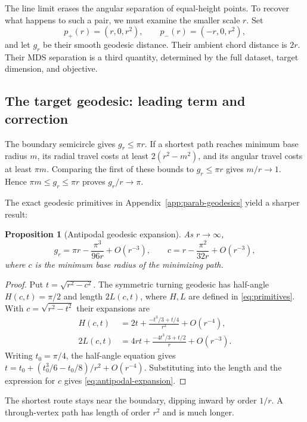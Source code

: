 \documentclass[11pt]{article}
\newtheorem{proposition}{Proposition}[section]
\theoremstyle{remark}\newtheorem{remark}[proposition]{Remark}
\begin{document}
The line limit erases the angular separation of equal-height points. To recover
what happens to such a pair, we must examine the smaller scale $r$. Set
\begin{equation}
 p_+(r)=(r,0,r^2),\qquad p_-(r)=(-r,0,r^2),
\end{equation}
and let $g_r$ be their smooth geodesic distance. Their ambient chord distance
is $2r$. Their MDS separation is a third quantity, determined by the full
dataset, target dimension, and objective.

\subsection{The target geodesic: leading term and correction}
The boundary semicircle gives $g_r\le\pi r$. If a shortest path reaches minimum
base radius $m$, its radial travel costs at least $2(r^2-m^2)$, and its angular
travel costs at least $\pi m$. Comparing the first of these bounds to
$g_r\le\pi r$ gives $m/r\to1$. Hence
$\pi m\le g_r\le\pi r$ proves $g_r/r\to\pi$.

The exact geodesic primitives in Appendix~\ref{app:parab-geodesics} yield a
sharper result:
\begin{proposition}[Antipodal geodesic expansion]\label{prop:antipodal}
As $r\to\infty$,
\begin{equation}\label{eq:antipodal-expansion}
 g_r=\pi r-\frac{\pi^3}{96r}+O(r^{-3}),\qquad
 c=r-\frac{\pi^2}{32r}+O(r^{-3}),
\end{equation}
where $c$ is the minimum base radius of the minimizing path.
\end{proposition}
\begin{proof}
Put $t=\sqrt{r^2-c^2}$. The symmetric turning geodesic has half-angle
$H(c,t)=\pi/2$ and length $2L(c,t)$, where $H,L$ are defined in
\eqref{eq:primitives}. With $c=\sqrt{r^2-t^2}$ their expansions are
\begin{align}
 H(c,t)&=2t+\frac{-t^3/3+t/4}{r^2}+O(r^{-4}),\\
 2L(c,t)&=4rt+\frac{-4t^3/3+t/2}{r}+O(r^{-3}).
\end{align}
Writing $t_0=\pi/4$, the half-angle equation gives
$t=t_0+(t_0^3/6-t_0/8)/r^2+O(r^{-4})$. Substituting into the length and the
expression for $c$ gives \eqref{eq:antipodal-expansion}.
\end{proof}
The shortest route stays near the boundary, dipping inward by order $1/r$.
A through-vertex path has length of order $r^2$ and is much longer.
\end{document}
